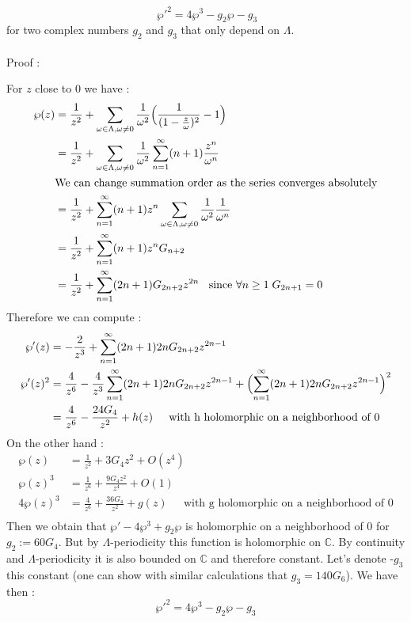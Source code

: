\documentclass[letterpaper,10pt]{article}
\begin{document}
\[\ \wp'^2 = 4\wp^3 - g_2\wp - g_3 \] for two complex numbers $g_2$ and $g_3$ that only depend on $\Lambda$.

{\itshape \paragraph{} Proof :} For $z$ close to 0 we have : \begin{align*}
    \wp(z) &= \frac{1}{z^2} +  \sum_{\omega \in \Lambda , \omega \neq 0 }\frac{1}{\omega^2}  \Bigl(\frac{1}{(1 - \frac{z}{\omega})^2} - 1\Bigr) \\
     &=  \frac{1}{z^2} +  \sum_{\omega \in \Lambda , \omega \neq 0 }\frac{1}{\omega^2}  \sum_{n = 1}^\infty (n+1)\frac{z^n}{\omega^n}\\
     &\text{We can change summation order as the series converges absolutely}\\
     &=  \frac{1}{z^2} +  \sum_{n = 1}^\infty (n+1)z^n  \sum_{\omega \in \Lambda , \omega \neq 0 } \frac{1}{\omega^2}\frac{1}{\omega^n} \\
     &=  \frac{1}{z^2} +  \sum_{n = 1}^\infty (n+1)z^n G_{n+2}  \\
     &=  \frac{1}{z^2} +  \sum_{n = 1}^\infty (2n+1) G_{2n+2} z^{2n} \;\; \text{  since  } \forall n \geq 1 \; G_{2n+1} = 0  \\
\end{align*}
Therefore we can compute : \begin{align*}
  \wp'(z) &= -\frac{2}{z^3} + \sum_{n = 1}^\infty (2n+1)2n G_{2n+2} z^{2n-1} \\
  \wp'(z)^2 &= \frac{4}{z^6} - \frac{4}{z^3}\sum_{n = 1}^\infty (2n+1)2n G_{2n+2} z^{2n-1} + \Bigl(\sum_{n = 1}^\infty (2n+1)2n G_{2n+2} z^{2n-1}\Bigr)^2\\
  &= \frac{4}{z^6} - \frac{24G_4}{z^2} + h(z) \;\;\;\; \text{ with h holomorphic on a neighborhood of 0}
\end{align*} On the other hand :
\begin{align*}
  \wp(z) &= \frac{1}{z^2} + 3G_4z^2 + O(z^4) \\
  \wp(z)^3 &= \frac{1}{z^6} + \frac{9G_4z^2}{z^4} + O(1) \\
   4\wp(z)^3 &= \frac{4}{z^6} + \frac{36G_4}{z^2} + g(z)  \;\;\;\; \text{ with g holomorphic on a neighborhood of 0}\\
\end{align*} Then we obtain that $\wp' - 4\wp^3 + g_2\wp$ is holomorphic on a neighborhood of 0 for $g_2 := 60G_4$. But by $\Lambda$-periodicity this function is holomorphic on 
 $\mathbb{C}$. By continuity and $\Lambda$-periodicity it is also bounded on $\mathbb{C}$ and therefore constant.
 Let's denote -$g_3$ this constant (one can show with similar calculations that $g_3 = 140G_6$). We have then :
  \[ \wp'^2 = 4\wp^3 - g_2\wp - g_3  \]
\end{document}
